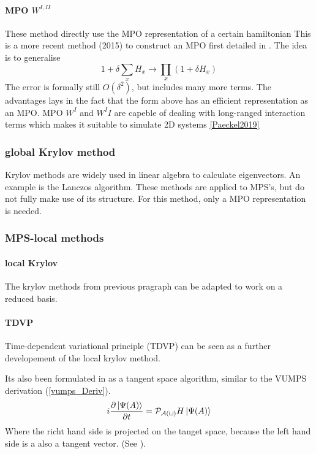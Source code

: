 \paragraph{ MPO $W^{I,II}$}
These method directly use the MPO representation of a certain hamiltonian
This is a more recent method (2015) to construct an MPO first detailed in \cite{Zaletel2015}. The idea is to generalise
\begin{equation}
    1+ \delta \sum_x H_x \rightarrow \prod_x (1+  \delta H_x)
\end{equation}
The error is formally still $O(\delta^2)$, but includes many more terms. The advantages lays in the fact that the form above has an efficient representation as an MPO. MPO $W^I$ and $W^II$ are capeble of dealing with long-ranged interaction terms which makes it suitable to simulate 2D systems \cref{Paeckel2019}

\subsubsection{global Krylov method }

Krylov methods are widely used in linear algebra to calculate eigenvectors. An example is the Lanczos algorithm. These methods are applied to MPS's, but do not fully make use of its structure. For this method, only a MPO representation is needed.


\subsubsection{MPS-local methods }

\paragraph{local Krylov}
The krylov methods from previous pragraph can be adapted to work on a reduced basis.

\paragraph{TDVP} Time-dependent variational principle (TDVP) can be seen as a further developement of the local krylov method.

Its also been formulated in as a tangent space algorithm, similar to the VUMPS derivation (\cref{vumps_Deriv}).
\begin{equation}
    i \frac{\partial \ket{ \Psi( A ) }}{\partial t} = \mathcal{P_{ A( t )} } H  \ket{ \Psi( A ) }
\end{equation}
Where the richt hand side is projected on the tanget space, because the left hand side is a also a tangent vector. (See \cite{Vanderstraeten2019}).

